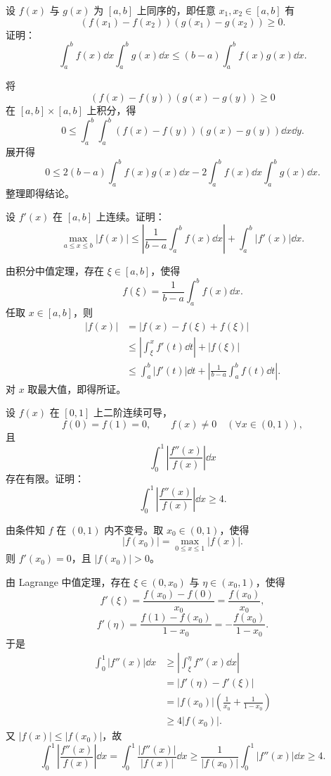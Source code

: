 \begin{problem}
	设 $f(x)$ 与 $g(x)$ 为 $[a,b]$ 上同序的，即任意 $x_1,x_2\in[a,b]$ 有
	\[
	(f(x_1)-f(x_2))(g(x_1)-g(x_2))\geq0.
	\]
	证明：
	\[
	\int_a^b f(x)\dd x\int_a^b g(x)\dd x
	\leq
	(b-a)\int_a^b f(x)g(x)\dd x.
	\]
\end{problem}

\begin{solution}
	将
	\[
	(f(x)-f(y))(g(x)-g(y))\geq0
	\]
	在 $[a,b]\times[a,b]$ 上积分，得
	\[
	0\leq
	\int_a^b\int_a^b(f(x)-f(y))(g(x)-g(y))\dd x\dd y.
	\]
	展开得
	\[
	0\leq
	2(b-a)\int_a^b f(x)g(x)\dd x
	-2\int_a^b f(x)\dd x\int_a^b g(x)\dd x.
	\]
	整理即得结论。
\end{solution}

\begin{problem}
	设 $f'(x)$ 在 $[a,b]$ 上连续。证明：
	\[
	\max_{a\leq x\leq b}|f(x)|
	\leq
	\left|\frac1{b-a}\int_a^b f(x)\dd x\right|
	+\int_a^b |f'(x)|\dd x.
	\]
\end{problem}

\begin{solution}
	由积分中值定理，存在 $\xi\in[a,b]$，使得
	\[
	f(\xi)=\frac1{b-a}\int_a^b f(x)\dd x.
	\]
	任取 $x\in[a,b]$，则
	\[
	\begin{aligned}
		|f(x)|
		&=|f(x)-f(\xi)+f(\xi)|\\
		&\leq \left|\int_\xi^x f'(t)\dd t\right|+|f(\xi)|\\
		&\leq \int_a^b |f'(t)|\dd t
		+\left|\frac1{b-a}\int_a^b f(t)\dd t\right|.
	\end{aligned}
	\]
	对 $x$ 取最大值，即得所证。
\end{solution}

\begin{problem}
	设 $f(x)$ 在 $[0,1]$ 上二阶连续可导，
	\[
	f(0)=f(1)=0,\qquad f(x)\neq0\quad (\forall x\in(0,1)),
	\]
	且
	\[
	\int_0^1\left|\frac{f''(x)}{f(x)}\right|\dd x
	\]
	存在有限。证明：
	\[
	\int_0^1\left|\frac{f''(x)}{f(x)}\right|\dd x\geq4.
	\]
\end{problem}

\begin{solution}
	由条件知 $f$ 在 $(0,1)$ 内不变号。取 $x_0\in(0,1)$，使得
	\[
	|f(x_0)|=\max_{0\leq x\leq1}|f(x)|.
	\]
	则 $f'(x_0)=0$，且 $|f(x_0)|>0$。
	
	由 Lagrange 中值定理，存在 $\xi\in(0,x_0)$ 与 $\eta\in(x_0,1)$，使得
	\[
	f'(\xi)=\frac{f(x_0)-f(0)}{x_0}
	=\frac{f(x_0)}{x_0},
	\]
	\[
	f'(\eta)=\frac{f(1)-f(x_0)}{1-x_0}
	=-\frac{f(x_0)}{1-x_0}.
	\]
	于是
	\[
	\begin{aligned}
		\int_0^1 |f''(x)|\dd x
		&\geq \left|\int_\xi^\eta f''(x)\dd x\right|\\
		&=|f'(\eta)-f'(\xi)|\\
		&=|f(x_0)|\left(\frac1{x_0}+\frac1{1-x_0}\right)\\
		&\geq4|f(x_0)|.
	\end{aligned}
	\]
	又 $|f(x)|\leq|f(x_0)|$，故
	\[
	\int_0^1\left|\frac{f''(x)}{f(x)}\right|\dd x
	=
	\int_0^1\frac{|f''(x)|}{|f(x)|}\dd x
	\geq
	\frac1{|f(x_0)|}\int_0^1 |f''(x)|\dd x
	\geq4.
	\]
\end{solution}

